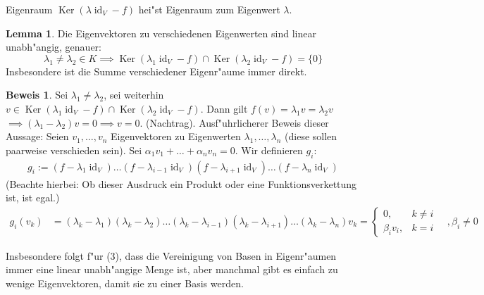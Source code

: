 \documentclass[11pt]{article}
\newcommand{\gq}[1]{\glqq{}#1\grqq{}} %
\DeclareMathOperator{\mKer}{Ker}
\DeclareMathOperator{\mId}{id}
\theoremstyle{remark}
\theoremstyle{definition}
\newtheorem{prof}{Beweis}
\newtheorem*{lemma}{Lemma}
\theoremstyle{remark}
\begin{document}
\begin{definition}{Eigenraum}{}
  \(\mKer(\lambda\mId_V-f)\) hei"st Eigenraum zum Eigenwert \(\lambda\).
\end{definition}
\begin{lemma}
  Die Eigenvektoren zu verschiedenen Eigenwerten sind linear unabh"angig, genauer: \[\lambda_1\neq\lambda_2\in K\implies\mKer(\lambda_1\mId_V-f)\cap\mKer(\lambda_2\mId_V-f)=\{0\}\]
  Insbesondere ist die Summe verschiedener Eigenr"aume immer direkt.
\end{lemma}
\begin{prof}
  Sei \(\lambda_1\neq\lambda_2\), sei weiterhin \(v\in\mKer(\lambda_1\mId_V-f)\cap\mKer(\lambda_2\mId_V-f)\). Dann gilt \(f(v)=\lambda_1v=\lambda_2v\) \(\implies(\lambda_1-\lambda_2)v = 0\implies v = 0\).
(Nachtrag). Ausf"uhrlicherer Beweis dieser Aussage: Seien \(v_1,\dots,v_n\) Eigenvektoren zu Eigenwerten \(\lambda_1,\dots,\lambda_n\) (diese sollen paarweise verschieden sein). Sei \(\alpha_1 v_1+\dots + \alpha_nv_n = 0\). Wir definieren \(g_i\):
  \begin{align*}
    g_i := (f-\lambda_1\mId_V)\dots(f-\lambda_{i-1}\mId_V)(f-\lambda_{i+1}\mId_V)\dots(f-\lambda_n\mId_V)
  \end{align*}
  (Beachte hierbei: Ob dieser Ausdruck ein Produkt oder eine Funktionsverkettung ist, ist egal.)
  \begin{align*}
    g_i(v_k) &= (\lambda_k-\lambda_1)(\lambda_k-\lambda_2)\dots(\lambda_k-\lambda_{i-1})(\lambda_k-\lambda_{i+1})\dots(\lambda_k-\lambda_n)v_k =
               \begin{cases}
                 0, & k\neq i \\
                 \beta_iv_i, & k = i
               \end{cases} \quad ,\beta_i\neq 0
  \end{align*}
\end{prof}
Insbesondere folgt f"ur (3), dass die Vereinigung von Basen in Eigenr"aumen immer eine linear unabh"angige Menge ist, aber manchmal gibt es einfach \gq{zu wenige} Eigenvektoren, damit sie zu einer Basis werden.
\end{document}
